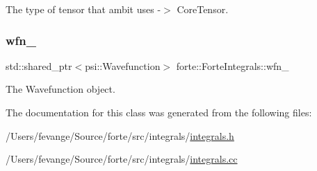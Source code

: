 The type of tensor that ambit uses -\/$>$ Core\+Tensor. 

\mbox{\label{classforte_1_1_forte_integrals_aa054ac658980cf98f4f614fc34e4e0dd}} 
\subsubsection{\texorpdfstring{wfn\+\_\+}{wfn\_}}
{\footnotesize\ttfamily std\+::shared\+\_\+ptr$<$psi\+::\+Wavefunction$>$ forte\+::\+Forte\+Integrals\+::wfn\+\_\+\hspace{0.3cm}{\ttfamily [protected]}}



The Wavefunction object. 



The documentation for this class was generated from the following files\+:\begin{DoxyCompactItemize}
\item 
/\+Users/fevange/\+Source/forte/src/integrals/\mbox{\hyperlink{integrals_8h}{integrals.\+h}}\item 
/\+Users/fevange/\+Source/forte/src/integrals/\mbox{\hyperlink{integrals_8cc}{integrals.\+cc}}\end{DoxyCompactItemize}
